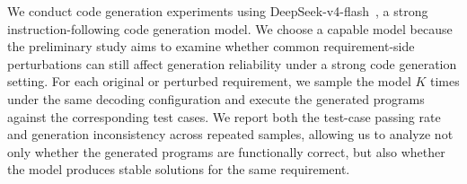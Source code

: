 
We conduct code generation experiments using DeepSeek-v4-flash~\cite{deepseekai2026deepseekv4}, a strong instruction-following code generation model. We choose a capable model because the preliminary study aims to examine whether common requirement-side perturbations can still affect generation reliability under a strong code generation setting. For each original or perturbed requirement, we sample the model $K$ times under the same decoding configuration and execute the generated programs against the corresponding test cases. We report both the test-case passing rate and generation inconsistency across repeated samples, allowing us to analyze not only whether the generated programs are functionally correct, but also whether the model produces stable solutions for the same requirement.

